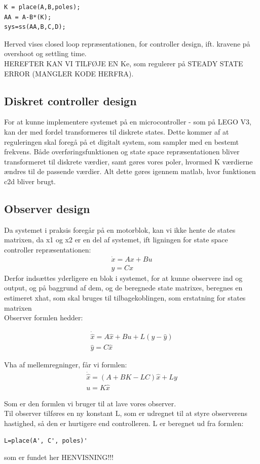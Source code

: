 \begin{lstlisting}[frame=single]
K = place(A,B,poles);
AA = A-B*(K);
sys=ss(AA,B,C,D);
\end{lstlisting}

Herved vises closed loop repræsentationen, for controller design, ift. kravene på overshoot og settling time.\\


HEREFTER KAN VI TILFØJE EN Ke, som regulerer på STEADY STATE ERROR (MANGLER KODE HERFRA). 

\subsection{Diskret controller design}
For at kunne implementere systemet på en microcontroller - som på LEGO V3, kan der med fordel transformeres til diskrete states. Dette kommer af at reguleringen skal foregå på et digitalt system, som sampler med en bestemt frekvens. 
Både overføringsfunktionen og state space repræsentationen bliver transformeret til diskrete værdier, samt gøres vores poler, hvormed K værdierne ændres til de passende værdier. Alt dette gøres igennem matlab, hvor funktionen c2d bliver brugt. 

\subsection{Observer design}
Da systemet i praksis foregår på en motorblok, kan vi ikke hente de states matrixen, da x1 og x2 er en del  af systemet, ift ligningen for state space controller repræsentationen: 
\begin{gather}
  \dot{x}=Ax+Bu \\
  y=Cx
\end{gather}
Derfor indsættes yderligere en blok i systemet, for at kunne observere ind og output, og på baggrund af dem, og de beregnede state matrixes, beregnes en estimeret xhat, som skal bruges til tilbagekoblingen, som erstatning for states matrixen \\
Observer formlen hedder:


\begin{gather}
  \dot{\hat{x}}=A\hat{x}+Bu+L(y-\hat{y}) \\
  \hat{y}=C\hat{x}
\end{gather}

Vha af mellemregninger, får vi formlen: 
\begin{gather}
  \dot{\hat{x}}=(A+BK-LC)\hat{x}+Ly \\
  u=K\hat{x}
\end{gather}

Som er den formlen vi bruger til at lave vores observer.\\

Til observer tilføres en ny konstant L, som er udregnet til at styre observerens hastighed, så den er hurtigere end controlleren. L er beregnet ud fra formlen:
\begin{lstlisting}[frame=single]
L=place(A', C', poles)'
\end{lstlisting}

som er fundet her HENVISNING!!!
 